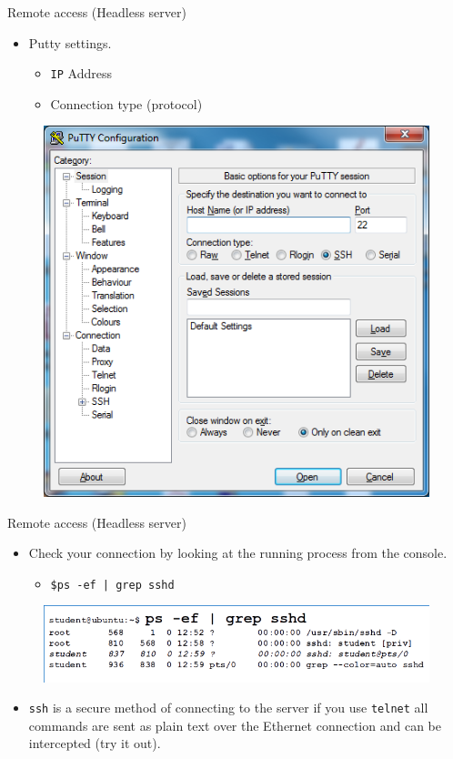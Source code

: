 \documentclass{beamer}
\begin{document}
\begin{frame}{Remote access (Headless server)}
  \begin{itemize}
    \item Putty settings.
      \begin{itemize}
        \item \texttt{IP} Address
        \item Connection type (protocol)
      \end{itemize}
  \end{itemize}
  \begin{figure}
    \begin{center}
      \includegraphics[width=0.5\linewidth]{Putty1.png}
    \end{center}
  \end{figure}
\end{frame}

\begin{frame}{Remote access (Headless server)}
  \begin{itemize}
    \item Check your connection by looking at the running process from the console.
      \begin{itemize}
        \item \texttt{\$ps -ef | grep sshd}
      \end{itemize}
  \end{itemize}
  \begin{figure}
    \begin{center}
      \includegraphics[width=1\linewidth]{ps.png}
    \end{center}
  \end{figure}
  \begin{itemize}
      \item \texttt{ssh} is a secure method of connecting to the server if you use \texttt{telnet} all commands are sent as plain text over the Ethernet connection and can be intercepted (try it out).
  \end{itemize}
\end{frame}
\end{document}
